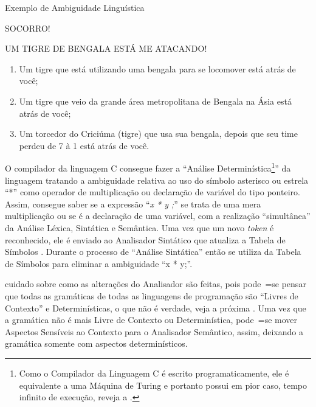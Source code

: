\begin{quadro}[!htb]
\caption{Exemplo de Ambiguidade Linguística}
\label{exemploDeAmbiguidadeLinguistica}
\begin{bluebox}
    SOCORRO!

    UM TIGRE DE BENGALA ESTÁ ME ATACANDO!

    \begin{enumerate}%
        \item Um tigre que está utilizando uma bengala para se locomover está atrás de você;
        \item Um tigre que veio da grande área metropolitana de Bengala na Ásia está atrás de você;
        \item Um torcedor do Criciúma (tigre) que usa sua bengala,
        depois que seu time perdeu de 7 à 1 está atrás de você.
    \end{enumerate}
\end{bluebox}
\end{quadro}

O compilador da linguagem C consegue fazer a ``Análise Determinística\footnote{
Como o Compilador da Linguagem C é escrito programaticamente,
ele é equivalente a uma Máquina de Turing e
portanto possui em pior caso,
tempo infinito de execução,
reveja a .
}'' da linguagem tratando a ambiguidade relativa ao uso do símbolo asterisco ou
estrela ``*'' como operador de multiplicação ou
declaração de variável do tipo ponteiro.
Assim,
consegue saber se a expressão ``\textit{x * y ;}'' se trata de uma mera multiplicação ou
se é a declaração de uma variável,
com a realização ``simultânea'' da Análise Léxica,
Sintática e
Semântica.
Uma vez que um novo \textit{token} é reconhecido,
ele é enviado ao Analisador Sintático que atualiza a Tabela de Símbolos \cite{ahoCompilerDragonBook}.
Durante o processo de ``Análise Sintática'' então se utiliza da Tabela de Símbolos para eliminar a ambiguidade ``x * y;''.

 cuidado sobre como as alterações do Analisador são feitas,
pois pode~=se pensar que todas as gramáticas de todas as linguagens de programação são ``Livres de Contexto'' e
Determinísticas,
o que não é verdade,
veja a próxima .
Uma vez que a gramática não é mais Livre de Contexto ou
Determinística,
pode~=se mover Aspectos Sensíveis ao Contexto para o Analisador Semântico,
assim,
deixando a gramática somente com aspectos determinísticos.


